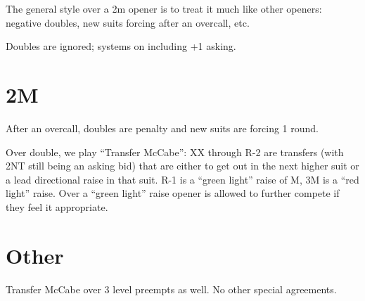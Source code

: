 \documentclass[tom-ari]{subfile}
\begin{document}
	The general style over a 2m opener is to treat it much like other openers: negative doubles, new suits forcing after an overcall, etc.
	
	Doubles are ignored; systems on including +1 asking.
	
	\section{2M}
	
	After an overcall, doubles are penalty and new suits are forcing 1 round.
	
	Over double, we play ``Transfer McCabe'': XX through R-2 are transfers (with 2NT still being an asking bid) that are either to get out in the next higher suit or a lead directional raise in that suit. R-1 is a ``green light'' raise of M, 3M is a ``red light'' raise. Over a ``green light'' raise opener is allowed to further compete if they feel it appropriate.
	
	\section{Other}
	
	Transfer McCabe over 3 level preempts as well. No other special agreements.
	
\end{document}
